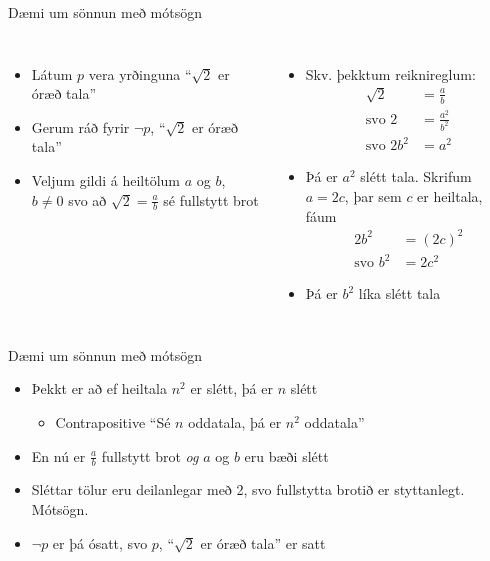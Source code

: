 \documentclass{beamer}
\begin{document}
\begin{frame}{Dæmi um sönnun með mótsögn}
    \begin{columns}
        \begin{itemize}[<+->]
            \item Látum $p$ vera yrðinguna ``$\sqrt{2}$ er óræð tala''
            \item Gerum ráð fyrir $\lnot p$, ``$\sqrt{2}$ er óræð tala''
            \item Veljum gildi á heiltölum $a$ og $b$, $b \neq 0$ svo að $\sqrt{2} = \frac{a}{b}$ sé fullstytt brot
        \end{itemize}
        \begin{itemize}[<+->]
            \item Skv. þekktum reiknireglum:
            \begin{align*}
                \sqrt{2} &= \frac{a}{b}\\
                \text{svo } 2 &= \frac{a^2}{b^2}\\
                \text{svo } 2b^2 &= a^2
            \end{align*}
            \item Þá er $a^2$ slétt tala. Skrifum $a = 2c$, þar sem $c$ er heiltala, fáum 
            \begin{align*}
                2b^2 &= (2c)^2\\
                \text{svo } b^2 &= 2c^2
            \end{align*}
            \item Þá er $b^2$ líka slétt tala
        \end{itemize}
    \end{columns}
\end{frame}

\begin{frame}{Dæmi um sönnun með mótsögn}
    \begin{itemize}
        \item Þekkt er að ef heiltala $n^2$ er slétt, þá er $n$ slétt \pause
        \begin{itemize}
            \item Contrapositive ``Sé $n$ oddatala, þá er $n^2$ oddatala''
        \end{itemize}
        \item En nú er $\frac{a}{b}$ fullstytt brot \emph{og} $a$ og $b$ eru bæði slétt
        \item Sléttar tölur eru deilanlegar með 2, svo fullstytta brotið er styttanlegt. Mótsögn.
        \item $\lnot p$ er þá ósatt, svo $p$, ``$\sqrt{2}$ er óræð tala'' er satt
    \end{itemize}
\end{frame}
\end{document}
